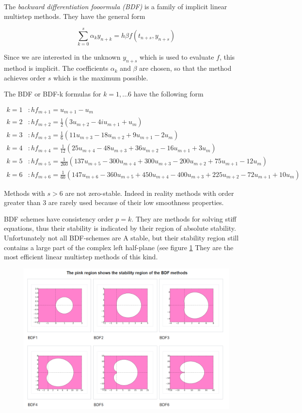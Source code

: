 	The \emph{backward differentiation fooormula (BDF)} is a family of implicit linear multistep methods. They have the general form
	
	\begin{equation}
		\sum_{k=0}^{s} \alpha_k y_{n+k} = h \beta f(t_{n+s}, y_{n+s})
	\end{equation}

	Since we are interested in the unknown $y_{n+s}$ which is used to evaluate $f$, this method is implicit. The coefficients $\alpha_k$ and $\beta$ are chosen, so that the method achieves order $s$ which is the maximum possible.
	
	The BDF or BDF-k formulas for $k=1,...6$ have the following form
	
	\begin{align*}
		k = 1 &: h f_{m+1} = u_{m+1} - u_m \\
		k = 2 &: h f_{m+2} = \frac{1}{2} (3 u_{m+2} - 4 iu_{m+1} + u_m) \\
		k = 3 &: h f_{m+3} = \frac{1}{6} (11 u_{m+3} - 18 u_{m+2} + 9 u_{m+1} - 2 u_m) \\
		k = 4 &: h f_{m+4} = \frac{1}{12} (25 u_{m+4} - 48 u_{m+3} + 36 u_{m+2} - 16 u_{m+1} + 3 u_m) \\
		k = 5 &: h f_{m+5} = \frac{1}{260} (137 u_{m+5} - 300 u_{m+4} + 300 u_{m+3} - 200 u_{m+2} +75 u_{m+1} -12 u_m) \\
		k = 6 &: h f_{m+6} = \frac{1}{60} (147 u_{m+6} - 360 u_{m+5} + 450 u_{m+4} - 400 u_{m+3} + 225 u_{m+2} - 72 u_{m+1} + 10 u_m)
	\end{align*}
	
	Methods with $s > 6$ are not zero-stable. Indeed in reality methods with order greater than 3 are rarely used because of their low smoothness properties.
	
	BDF schemes have consistency order $p = k$. They are methods for solving stiff equations, thus their stability is indicated by their region of absolute stability. Unfortunately not all BDF-schemes are A stable, but their stability region still contains a large part of the complex left half-plane (see figure \ref{fig:screenshot020} They are the most efficient linear multistep methods of this kind.
	
	\begin{figure}[H]
		\centering
		\includegraphics[width=0.7\linewidth]{screenshot020}
		\caption{}
		\label{fig:screenshot020}
	\end{figure}
	
